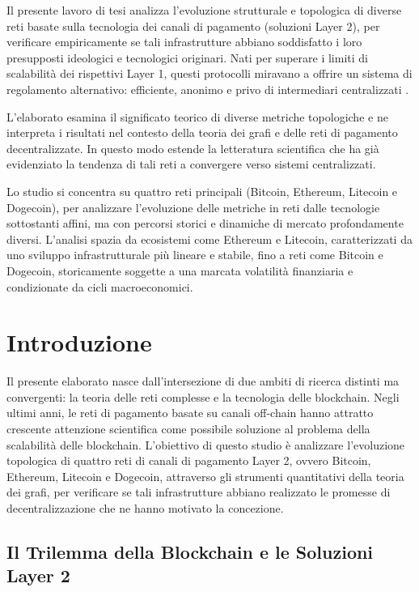 \documentclass[12pt,a4paper,oneside]{book}
\begin{document}
Il presente lavoro di tesi analizza l'evoluzione strutturale e topologica di diverse reti basate sulla tecnologia dei canali di pagamento (soluzioni Layer 2), per verificare empiricamente se tali infrastrutture abbiano soddisfatto i loro presupposti ideologici e tecnologici originari. Nati per superare i limiti di scalabilità dei rispettivi Layer 1, questi protocolli miravano a offrire un sistema di regolamento alternativo: efficiente, anonimo e privo di intermediari centralizzati \cite{MagnaniMarzolla2026}.

L'elaborato esamina il significato teorico di diverse metriche topologiche e ne interpreta i risultati nel contesto della teoria dei grafi e delle reti di pagamento decentralizzate. In questo modo estende la letteratura scientifica che ha già evidenziato la tendenza di tali reti a convergere verso sistemi centralizzati.

Lo studio si concentra su quattro reti principali (Bitcoin, Ethereum, Litecoin e Dogecoin), per analizzare l'evoluzione delle metriche in reti dalle tecnologie sottostanti affini, ma con percorsi storici e dinamiche di mercato profondamente diversi. L'analisi spazia da ecosistemi come Ethereum e Litecoin, caratterizzati da uno sviluppo infrastrutturale più lineare e stabile, fino a reti come Bitcoin e Dogecoin, storicamente soggette a una marcata volatilità finanziaria e condizionate da cicli macroeconomici.

\newpage
\tableofcontents
\chapter{Introduzione}

Il presente elaborato nasce dall'intersezione di due ambiti di ricerca distinti ma convergenti: la teoria delle reti complesse e la tecnologia delle blockchain. Negli ultimi anni, le reti di pagamento basate su canali off-chain hanno attratto crescente attenzione scientifica come possibile soluzione al problema della scalabilità delle blockchain. L'obiettivo di questo studio è analizzare l'evoluzione topologica di quattro reti di canali di pagamento Layer 2, ovvero Bitcoin, Ethereum, Litecoin e Dogecoin, attraverso gli strumenti quantitativi della teoria dei grafi, per verificare se tali infrastrutture abbiano realizzato le promesse di decentralizzazione che ne hanno motivato la concezione.

\section{Il Trilemma della Blockchain e le Soluzioni Layer 2}
\end{document}
